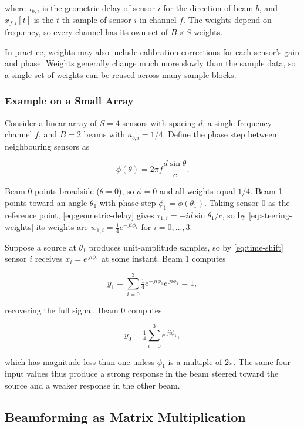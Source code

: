 where $\tau_{b,i}$ is the geometric delay of sensor $i$ for the direction of beam $b$, and $x_{f,i}[t]$ is the $t$-th sample of sensor $i$ in channel $f$. The weights depend on frequency, so every channel has its own set of $B \times S$ weights.

In practice, weights may also include calibration corrections for each sensor's gain and phase. Weights generally change much more slowly than the sample data, so a single set of weights can be reused across many sample blocks.

\subsubsection{Example on a Small Array}
\label{sec:example-on-a-small-array}

Consider a linear array of $S=4$ sensors with spacing $d$, a single frequency channel $f$, and $B=2$ beams with $a_{b,i}=1/4$. Define the phase step between neighbouring sensors as

\[
  \phi(\theta) = 2\pi f \frac{d \sin\theta}{c}.
\]

Beam 0 points broadside ($\theta = 0$), so $\phi = 0$ and all weights equal $1/4$. Beam 1 points toward an angle $\theta_1$ with phase step $\phi_1 = \phi(\theta_1)$. Taking sensor 0 as the reference point, \cref{eq:geometric-delay} gives $\tau_{1,i} = -i d\sin\theta_1/c$, so by \cref{eq:steering-weights} its weights are $w_{1,i} = \tfrac14 e^{-j i \phi_1}$ for $i = 0,\dots,3$.

Suppose a source at $\theta_1$ produces unit-amplitude samples, so by \cref{eq:time-shift} sensor $i$ receives $x_i = e^{\,j i \phi_1}$ at some instant. Beam 1 computes

\[
  y_1 = \sum_{i=0}^{3} \tfrac14 e^{-j i \phi_1} e^{\,j i \phi_1} = 1,
\]

recovering the full signal. Beam 0 computes

\[
  y_0 = \tfrac14 \sum_{i=0}^{3} e^{\,j i \phi_1},
\]

which has magnitude less than one unless $\phi_1$ is a multiple of $2\pi$. The same four input values thus produce a strong response in the beam steered toward the source and a weaker response in the other beam.

\subsection{Beamforming as Matrix Multiplication}
\label{sec:beamforming-as-matrix-multiplication}

